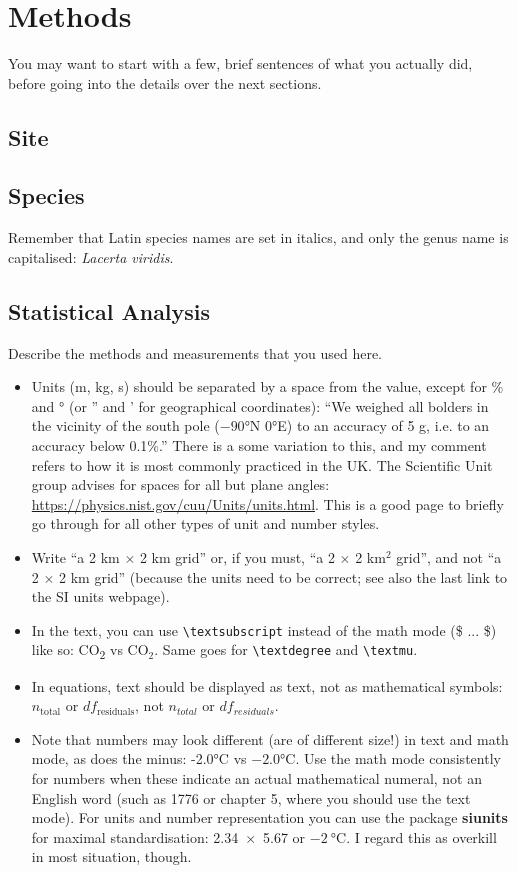\chapter{Methods}
\label{ch:methods}
You may want to start with a few, brief sentences of what you actually did, before going into the details over the next sections.

\section{Site}
\section{Species}
 Remember that Latin species names are set in italics, and only the genus name is capitalised: \emph{Lacerta viridis}.
\section{Statistical Analysis}

  Describe the methods and measurements that you used here.

\begin{itemize}
\item Units (m, kg, s) should be separated by a space from the value, except for \% and ° (or '' and ' for geographical coordinates): ``We weighed all bolders in the vicinity of the south pole ($-90$°N $0$°E) to an accuracy of 5 g, i.e. to an accuracy below 0.1\%.'' There is a some variation to this, and my comment refers to how it is most commonly practiced in the UK. The Scientific Unit group advises for spaces for all but plane angles: \url{https://physics.nist.gov/cuu/Units/units.html}. This is a good page to briefly go through for all other types of unit and number styles.

\item Write ``a 2 km $\times$ 2 km grid'' or, if you must, ``a 2 $\times$ 2 km$^2$ grid'', and not ``a 2 $\times$ 2 km grid'' (because the units need to be correct; see also the last link to the SI units webpage).

\item In the text, you can use \texttt{\textbackslash textsubscript} instead of the math mode (\$ ... \$) like so: CO\textsubscript{2} vs CO$_2$. Same goes for \texttt{\textbackslash textdegree} and \texttt{\textbackslash textmu}.

\item In equations, text should be displayed as text, not as mathematical symbols: $n_\text{total}$ or $df_\text{residuals}$, not $n_{total}$ or $df_{residuals}$.

\item Note that numbers may look different (are of different size!) in text and math mode, as does the minus: -2.0°C vs $-2.0$°C. Use the math mode consistently for numbers when these indicate an actual mathematical numeral, not an English word (such as 1776 or chapter 5, where you should use the text mode). For units and number representation you can use the package \textbf{siunits} for maximal standardisation: \num{2.34 x 5.67} or $\SI{-2}{\celsius}$. I regard this as overkill in most situation, though.
\end{itemize}  
 
